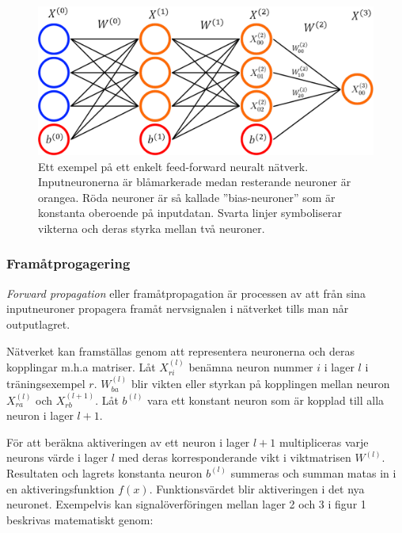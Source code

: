 \documentclass[a4paper,11pt,twoside]{article}
\begin{document}
\begin{figure}[h]\label{figFCC}
	\centering
  		\includegraphics[scale=0.4]{FCC.png}
  	\caption{Ett exempel på ett enkelt feed-forward neuralt nätverk. Inputneuronerna är blåmarkerade medan resterande neuroner är orangea. Röda neuroner är så kallade ”bias-neuroner” som är konstanta oberoende på inputdatan. Svarta linjer symboliserar vikterna och deras styrka mellan två neuroner.}
\end{figure}

\subsubsection{Framåtprogagering}
\textit{Forward propagation} eller framåtpropagation är processen av att från sina inputneuroner propagera framåt nervsignalen i nätverket tills man når outputlagret. \cite{cs231n} \cite{wikiStanford}

Nätverket kan framställas genom att representera neuronerna och deras kopplingar m.h.a matriser. Låt $X_{ri}^{(l)}$ benämna neuron nummer $i$ i lager $l$ i träningsexempel $r$. $W_{ba}^{(l)}$ blir vikten eller styrkan på kopplingen mellan neuron $X_{ra}^{(l)}$ och $X_{rb}^{(l+1)}$. Låt $b^{(l)}$ vara ett konstant neuron som är kopplad till alla neuron i lager $l+1$.  \cite{cs231n} \cite{wikiStanford}

För att beräkna aktiveringen av ett neuron i lager $l+1$ multipliceras varje neurons värde i lager $l$ med deras korresponderande vikt i viktmatrisen $W^{(l)}$. Resultaten och lagrets konstanta neuron $b^{(l)}$ summeras och summan matas in i en aktiveringsfunktion $f(x)$. Funktionsvärdet blir aktiveringen i det nya neuronet. Exempelvis kan signalöverföringen mellan lager 2 och 3 i figur 1 beskrivas matematiskt genom: \cite{cs231n} \cite{wikiStanford}

\end{document}
